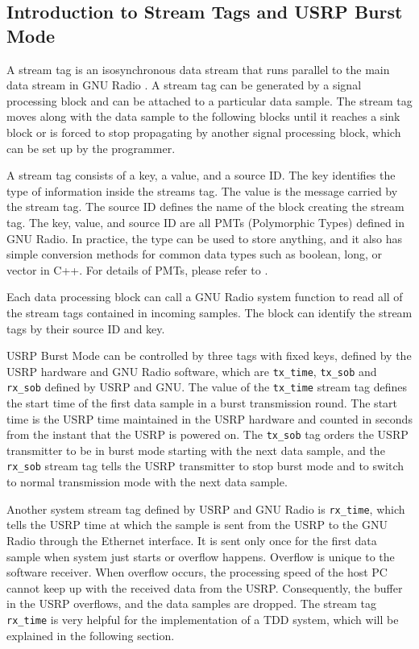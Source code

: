 \subsection{Introduction to Stream Tags and USRP Burst Mode}
A stream tag is an isosynchronous data stream that runs parallel to the main data stream in GNU Radio \cite{GNURadioStreamTags}. A stream tag can be generated by a signal processing block and can be attached to a particular data sample. The stream tag moves along with the data sample to the following blocks until it reaches a sink block or is forced to stop propagating by another signal processing block, which can be set up by the programmer.

A stream tag consists of a key, a value, and a source ID. The key identifies the type of information inside the streams tag. The value is the message carried by the stream tag. The source ID defines the name of the block creating the stream tag. The key, value, and source ID are all PMTs (Polymorphic Types) defined in GNU Radio. In practice, the type can be used to store anything, and it also has simple conversion methods for common data types such as boolean, long, or vector in C++. For details of PMTs, please refer to \cite{GNURadioPolymorphicType}.

Each data processing block can call a GNU Radio system function to read all of the stream tags contained in incoming samples. The block can identify the stream tags by their source ID and key.

USRP Burst Mode can be controlled by three tags with fixed keys, defined by the USRP hardware and GNU Radio software, which are \texttt{tx\_time}, \texttt{tx\_sob} and \texttt{rx\_sob} defined by USRP and GNU. The value of the \texttt{tx\_time} stream tag defines the start time of the first data sample in a burst transmission round. The start time is the USRP time maintained in the USRP hardware and counted in seconds from  the instant that the USRP is powered on. The \texttt{tx\_sob} tag orders the USRP transmitter to be in burst mode starting with the next data sample, and the \texttt{rx\_sob} stream tag tells the USRP transmitter to stop burst mode and to switch to normal transmission mode with the next data sample.

Another system stream tag defined by USRP and GNU Radio is \texttt{rx\_time}, which tells the USRP time at which the sample is sent from the USRP to the GNU Radio through the Ethernet interface. It is sent only once for the first data sample when system just starts or overflow happens. Overflow is unique to the software receiver. When overflow occurs, the processing speed of the host PC cannot keep up with the received data from the USRP. Consequently, the buffer in the USRP overflows, and the data samples are dropped. The stream tag \texttt{rx\_time} is very helpful for the implementation of a TDD system, which will be explained in the following section.

